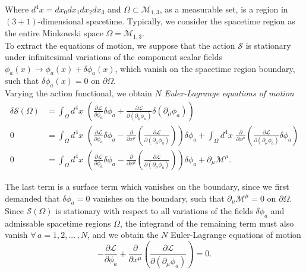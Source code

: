 \noindent Where $d^4 x = dx_0 dx_1 dx_2 dx_3$ and $\Omega \subset \mathcal{M}_{1,3}$, as a measurable set, is a region in $(3+1)$-dimensional spacetime. Typically, we consider the spacetime region as the entire Minkowski space $\Omega = \mathcal{M}_{1,3}$. \\

\noindent To extract the equations of motion, we suppose that the action $\mathcal{S}$ is stationary under infinitesimal variations of the component scalar fields $\phi_a(x) \rightarrow \phi_a(x) + \delta \phi_a(x)$, which vanish on the spacetime region boundary, such that $\delta\phi_a(x) = 0$ on $\partial\Omega$.  \\

\noindent Varying the action functional, we obtain $N$ \textit{Euler-Lagrange equations of motion}
\begin{align}
	\delta \mathcal{S} ( \Omega ) &= \int_\Omega d^4 x \,\, \left( \frac{\partial \mathscr{L}}{\partial \phi_a} \delta \phi_a + \frac{\partial \mathscr{L}}{\partial ( \partial_\mu \phi_a )} \delta ( \partial_\mu \phi_a ) \right) \\
	0 &= \int_\Omega d^4 x \,\, \left( \frac{\partial \mathscr{L}}{\partial \phi_a} \delta \phi_a - \frac{\partial}{\partial x^\mu} \left( \frac{\partial \mathscr{L}}{\partial ( \partial_\mu \phi_a )} \right) \right) \delta\phi_a + \int_\Omega d^4 x \,\, \frac{\partial}{\partial x^\mu} \left( \frac{\partial \mathscr{L}}{\partial ( \partial_\mu \phi_a )} \delta \phi_a \right) \\
	0 &= \int_\Omega d^4 x \,\, \left( \frac{\partial \mathscr{L}}{\partial \phi_a} \delta \phi_a - \frac{\partial}{\partial x^\mu} \left( \frac{\partial \mathscr{L}}{\partial ( \partial_\mu \phi_a )} \right) \right) \delta\phi_a + \partial_\mu \mathcal{M}^\mu.
\end{align}

\noindent The last term is a surface term which vanishes on the boundary, since we first demanded that $\delta\phi_a = 0$ vanishes on the boundary, such that $\partial_\mu \mathcal{M}^\mu = 0$ on $\partial\Omega$. \\

\noindent Since $\mathcal{S}(\Omega)$ is stationary with respect to all variations of the fields $\delta\phi_a$ and admissable spacetime regions $\Omega$, the integrand of the remaining term must also vanish $\forall \, a = 1, 2,... \, , N$, and we obtain the $N$ Euler-Lagrange equations of motion
\begin{equation}
-\frac{\partial \mathscr{L}}{\partial \phi_a} + \frac{\partial}{\partial x^\mu} \left( \frac{\partial \mathscr{L}}{\partial (\partial_\mu \phi_a)} \right) = 0.
\end{equation}

